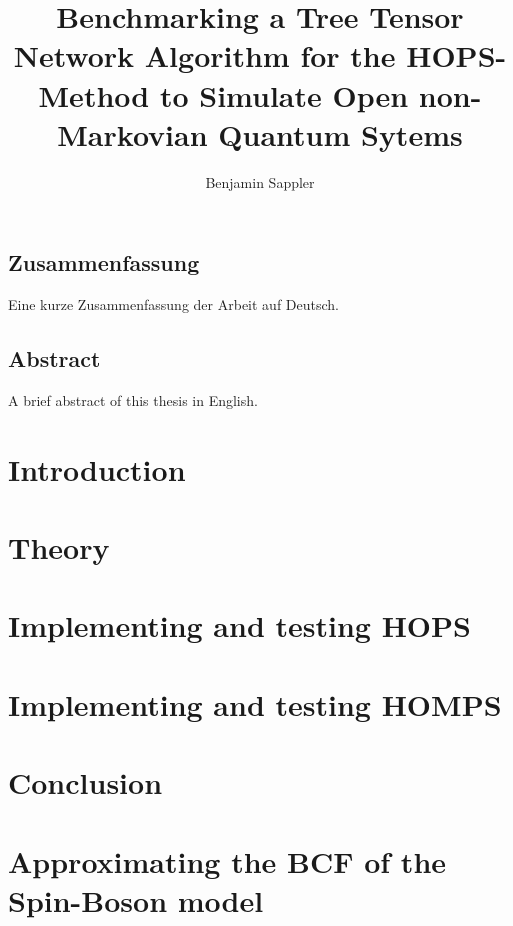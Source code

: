 \documentclass[%
thesis=student,%
coverpage=false,%
titlepage=false,%
headmarks=true, %
english,%
font=libertine, %
math=newpxtx, %
BCOR=5mm,%
coverBCOR=11mm%
]{tumbook}
\title{Benchmarking a Tree Tensor Network Algorithm for the HOPS-Method to Simulate Open non-Markovian Quantum Sytems}
\author{Benjamin Sappler}
\begin{document}
\frontmatter
\maketitle

\section*{Zusammenfassung}
Eine kurze Zusammenfassung der Arbeit auf Deutsch.

\section*{Abstract}
A brief abstract of this thesis in English.


\tableofcontents

\mainmatter{}

\chapter{Introduction}
\label{chap:Introduction}


\chapter{Theory}
\label{chap:Theory}


\chapter{Implementing and testing HOPS}
\label{chap:Implementing_HOPS}


\chapter{Implementing and testing HOMPS}
\label{chap:Implementing_HOMPS}


\chapter{Conclusion}
\label{chap:Conclusion}


\appendix
\chapter{Approximating the BCF of the Spin-Boson model}
\label{app:Approximating_BCF_Spin_Boson}


\backmatter{}

\printbibliography{} %
\end{document}
